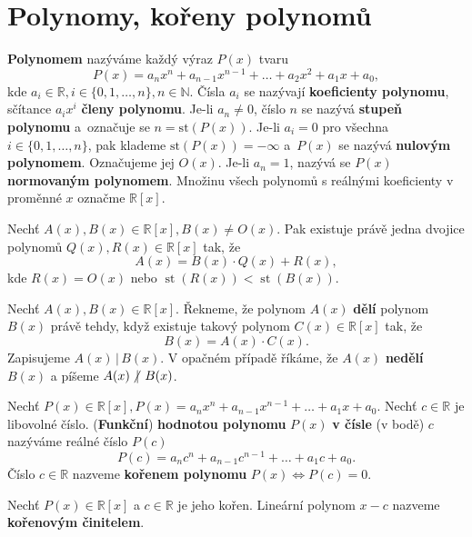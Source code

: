 \section{Polynomy, kořeny polynomů}
\begin{definition}
  \textbf{Polynomem} nazýváme každý výraz $P(x)$ tvaru
  \[
    P(x)=a_nx^n + a_{n-1}x^{n-1}+\dots + a_2x^2+a_1x+a_0,
  \]
  kde $a_i\in \mathbb R, i\in \{ 0,1,\dots , n \},n\in \mathbb N$. Čísla $a_i$ se nazývají \textbf{koeficienty polynomu}, sčítance $a_ix^i$ \textbf{členy polynomu}.
  Je-li $a_n\ne 0$, číslo $n$ se nazývá \textbf{stupeň polynomu} a~označuje se $n= \text{st}(P(x))$.
  Je-li $a_i=0$ pro všechna $i \in \{ 0,1,\dots ,n\}$, pak klademe $\text{st}(P(x))=-\infty$ a~$P(x)$ se nazývá \textbf{nulovým polynomem}.
  Označujeme jej $O(x).$ Je-li $a_n=1$, nazývá se $P(x)$ \textbf{normovaným polynomem}. Množinu všech polynomů s reálnými koeficienty v proměnné $x$ označme $\mathbb R[x]$.
\end{definition}

\begin{veta}
  Nechť $A(x), B(x) \in \mathbb R[x],B(x) \ne O(x).$ Pak existuje právě jedna dvojice polynomů $Q(x),R(x)\in \mathbb R[x]$ tak, že
  \[
    A(x)=B(x)\cdot Q(x)+R(x),
  \]
  kde $R(x)=O(x)$ nebo $\operatorname{st}(R(x))<\operatorname{st}(B(x)).$
\end{veta}

\begin{definition}
  Nechť $A(x), B(x) \in \mathbb R[x]$. Řekneme, že polynom $A(x)$ \textbf{dělí} polynom $B(x)$ právě tehdy, když existuje takový polynom $C(x) \in \mathbb R[x]$ tak, že
  \[
    B(x) = A(x)\cdot C(x).
  \]
  Zapisujeme $A(x) \, | \, B(x).$
  V opačném případě říkáme, že $A(x)$ \textbf{nedělí} $B(x)$ a píšeme $A(x) \, \centernot | \, B(x)$.
\end{definition}

\begin{definition}
  Nechť $P(x)\in \mathbb R[x], P(x)=a_nx^n+a_{n-1}x^{n-1}+\dots +a_1x+a_0.$ Nechť $c\in \mathbb R$ je libovolné číslo. (\textbf{Funkční}) \textbf{hodnotou polynomu} $P(x)$ \textbf{v čísle} (v bodě) $c$ nazýváme reálné číslo $P(c)$
  \[
    P(c) = a_nc^n+a_{n-1}c^{n-1}+\dots+a_1c+a_0.
  \]
  Číslo $c\in \mathbb R$ nazveme \textbf{kořenem polynomu} $P(x) \iff P(c) = 0$.
\end{definition}


\begin{definition}
  Nechť $P(x) \in \mathbb R [x]$ a $c\in \mathbb R$ je jeho kořen. Lineární polynom $x-c$ nazveme \textbf{kořenovým činitelem}.
\end{definition}

